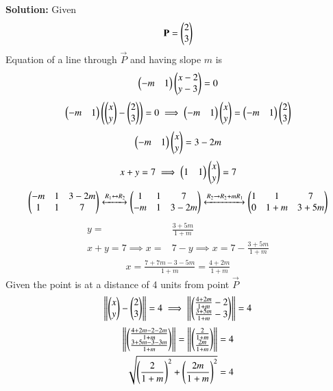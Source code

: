 \documentclass[journal]{IEEEtran}
\begin{document}
\textbf{Solution:}  
Given  
\begin{align}
\mathbf{P}=\begin{pmatrix}2\\3\end{pmatrix}
\end{align}
Equation of a line through $\vec{P}$ and having slope $m$ is
\begin{align}
 \begin{pmatrix}-m & 1\end{pmatrix}\begin{pmatrix}x-2 \\ y-3\end{pmatrix}=0  
 \end{align}
 \begin{align}
 \begin{pmatrix}-m & 1\end{pmatrix}\left(\begin{pmatrix}x\\y\end{pmatrix}-\begin{pmatrix}2\\3\end{pmatrix}\right)=0 \implies \begin{pmatrix}-m & 1\end{pmatrix}\begin{pmatrix}x\\y\end{pmatrix}=\begin{pmatrix}-m & 1\end{pmatrix}\begin{pmatrix}2\\3\end{pmatrix}
\end{align}
\begin{align}
\begin{pmatrix}-m & 1\end{pmatrix}\begin{pmatrix}x\\y\end{pmatrix}=3-2m
\end{align}
\begin{align}
  x+y=7 \implies  \begin{pmatrix}1 & 1\end{pmatrix}\begin{pmatrix}x\\y\end{pmatrix}=7
\end{align}
\begin{align}
\begin{pmatrix}-m & 1 & 3-2m \\ 1 &1 & 7\end{pmatrix} \xleftrightarrow{R_1\leftrightarrow R_2} \begin{pmatrix}1 &1 & 7 \\ -m & 1 & 3-2m\end{pmatrix} \xleftrightarrow{R_2\rightarrow R_2+mR_1} 
\begin{pmatrix}1 & 1& 7 \\0 & 1+m & 3+5m\end{pmatrix}
\end{align}
\begin{align}
y=&\frac{3+5m}{1+m}\\
x+y=7\implies x=&7-y \implies x=7-\frac{3+5m}{1+m}
\end{align}
\begin{align}
x=\frac{7+7m-3-5m}{1+m}=\frac{4+2m}{1+m}
\end{align}
Given the point is at a distance of 4 units from point $\vec{P}$
\begin{align}
  \left\lVert\begin{pmatrix}x\\y\end{pmatrix}-\begin{pmatrix}2\\3\end{pmatrix}\right\rVert=4 \implies \left\lVert\begin{pmatrix}\frac{4+2m}{1+m}-2\\\frac{3+5m}{1+m}-3\end{pmatrix}\right\rVert=4
\end{align}
\begin{align}
\left\lVert\begin{pmatrix}\frac{4+2m-2-2m}{1+m}\\ \frac{3+5m-3-3m}{1+m}\end{pmatrix}\right\rVert=\left\lVert\begin{pmatrix}\frac{2}{1+m}\\ \frac{2m}{1+m}\end{pmatrix}\right\rVert=4\\
\sqrt{\left(\frac{2}{1+m}\right)^2+{\left(\frac{2m}{1+m}\right)^2}}=4 
\end{align}
\end{document}
